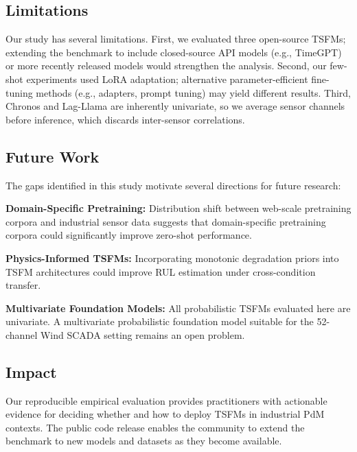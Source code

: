 \subsection{Limitations}

Our study has several limitations. First, we evaluated three open-source TSFMs; extending the benchmark to include closed-source API models (e.g., TimeGPT) or more recently released models would strengthen the analysis. Second, our few-shot experiments used LoRA adaptation; alternative parameter-efficient fine-tuning methods (e.g., adapters, prompt tuning) may yield different results. Third, Chronos and Lag-Llama are inherently univariate, so we average sensor channels before inference, which discards inter-sensor correlations.

\subsection{Future Work}

The gaps identified in this study motivate several directions for future research:

\textbf{Domain-Specific Pretraining:} Distribution shift between web-scale pretraining corpora and industrial sensor data suggests that domain-specific pretraining corpora could significantly improve zero-shot performance.

\textbf{Physics-Informed TSFMs:} Incorporating monotonic degradation priors into TSFM architectures could improve RUL estimation under cross-condition transfer.

\textbf{Multivariate Foundation Models:} All probabilistic TSFMs evaluated here are univariate. A multivariate probabilistic foundation model suitable for the 52-channel Wind SCADA setting remains an open problem.

\subsection{Impact}

Our reproducible empirical evaluation provides practitioners with actionable evidence for deciding whether and how to deploy TSFMs in industrial PdM contexts. The public code release enables the community to extend the benchmark to new models and datasets as they become available.
